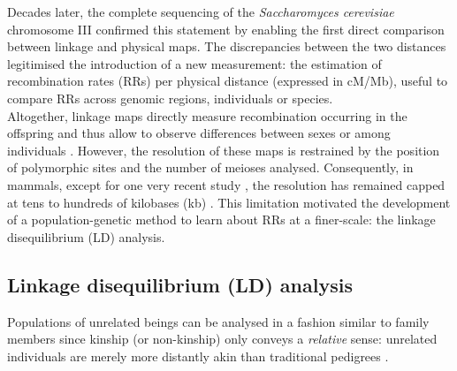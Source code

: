 
Decades later, the complete sequencing of the \textit{Saccharomyces cerevisiae} chromosome III \citep{oliver1992complete} confirmed this statement by enabling the first direct comparison between linkage and physical maps. 
The discrepancies between the two distances legitimised the introduction of a new measurement: the estimation of recombination rates (RRs) per physical distance (expressed in cM/Mb), useful to compare RRs across genomic regions, individuals or species.\\

Altogether, linkage maps directly measure recombination occurring in the offspring and thus allow to observe differences between sexes \citep[\textit{e.g.}][]{cheung2007polymorphic,coop2008highresolution} or among individuals \citep[\textit{e.g.}][]{broman1998comprehensive}.
However, the resolution of these maps is restrained by the position of polymorphic sites and the number of meioses analysed. 
Consequently, in mammals, except for one very recent study \citep{halldorsson2019characterizing}, the resolution has remained capped at tens to hundreds of kilobases (kb) \citep{shifman2006highresolution,billings2010patterns,kong2010finescale}.
This limitation motivated the development of a population-genetic method to learn about RRs at a finer-scale: the linkage disequilibrium (LD) analysis.





\subsection{Linkage disequilibrium (LD) analysis}%
\label{chap3:LD}

Populations of unrelated beings can be analysed in a fashion similar to family members since kinship (or non-kinship) only conveys a \textit{relative} sense: unrelated individuals are merely more distantly akin than traditional pedigrees \citep{nordborg2002linkage}.

